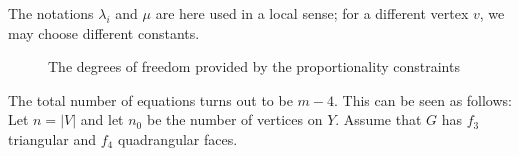 \documentclass{patmorin}
\begin{document}
The notations $\lambda_i$ and $\mu$ are here used in a local sense;
for a different vertex $v$, we may choose different constants.
\begin{figure}
     \caption{The degrees of freedom provided by the proportionality constraints}
  \end{figure}
The total number of equations
\thetag{\ref{eq:slope0}--\ref{eq:proportion2}} turns out to be $m-4$.
This can be seen as follows: Let $n=|V|$ and let $n_0$ be the number
of vertices on $Y$. Assume that $G$ has $f_3$ triangular and $f_4$
quadrangular faces.
\end{document}

